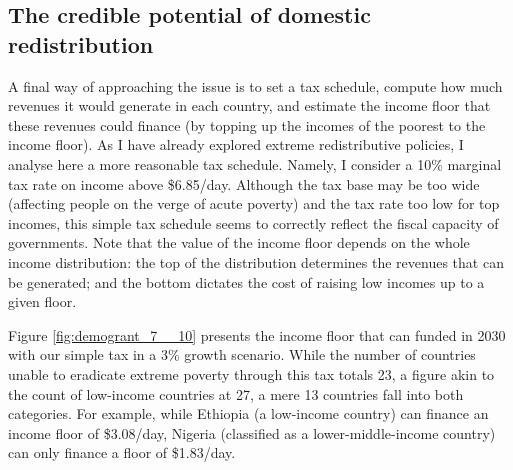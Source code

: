 
\subsection{The credible potential of domestic redistribution}

A final way of approaching the issue is to set a tax schedule, compute how much revenues it would generate in each country, and estimate the income floor that these revenues could finance (by topping up the incomes of the poorest to the income floor). As I have already explored extreme redistributive policies, I analyse here a more reasonable tax schedule. Namely, I consider a 10\% marginal tax rate on income above \$6.85/day. Although the tax base may be too wide (affecting people on the verge of acute poverty) %
and the tax rate too low for top incomes, 
this simple tax schedule seems to correctly reflect the fiscal capacity of governments. Note that the value of the income floor depends on the whole income distribution: the top of the distribution determines the revenues that can be generated; and the bottom dictates the cost of raising low incomes up to a given floor. 

Figure \ref{fig:demogrant_7__10} presents the income floor that can funded in 2030 with our simple tax in a 3\% growth scenario. While the number of countries unable to eradicate extreme poverty through this tax totals 23, a figure akin to the count of low-income countries at 27, a mere 13 countries fall into both categories.
For example, while Ethiopia (a low-income country) can finance an income floor of \$3.08/day, Nigeria (classified as a lower-middle-income country) can only finance a floor of \$1.83/day. 

